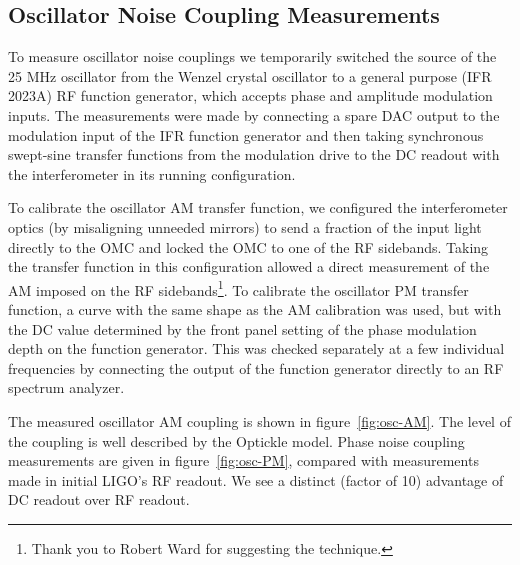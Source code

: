 \subsection{Oscillator Noise Coupling Measurements}

To measure oscillator noise couplings we temporarily switched the
source of the 25 MHz oscillator from the Wenzel crystal oscillator to
a general purpose (IFR 2023A) RF function generator, which accepts
phase and amplitude modulation inputs.  The measurements were made by
connecting a spare DAC output to the modulation input of the IFR
function generator and then taking synchronous swept-sine transfer
functions from the modulation drive to the DC readout with the
interferometer in its running configuration.

To calibrate the oscillator AM transfer function, we configured the
interferometer optics (by misaligning unneeded mirrors) to send a
fraction of the input light directly to the OMC and locked the OMC to
one of the RF sidebands.  Taking the transfer function in this
configuration allowed a direct measurement of the AM imposed on the RF
sidebands\footnote{Thank you to Robert Ward for suggesting the
  technique.}.  To calibrate the oscillator PM transfer function, a
curve with the same shape as the AM calibration was used, but with the
DC value determined by the front panel setting of the phase modulation
depth on the function generator.  This was checked separately at a few
individual frequencies by connecting the output of the function
generator directly to an RF spectrum analyzer.

The measured oscillator AM coupling is shown in
figure~\ref{fig:osc-AM}.  The level of the coupling is well described
by the Optickle model.  Phase noise coupling measurements are given in
figure~\ref{fig:osc-PM}, compared with measurements made in initial
LIGO's RF readout\cite{Smith2005Oscillator}.  We see a distinct
(factor of 10) advantage of DC readout over RF readout.

